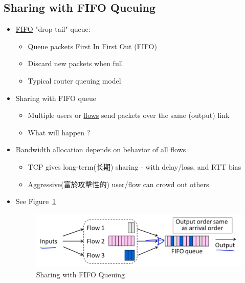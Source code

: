 \documentclass[12pt]{ctexart}   %
\begin{document}
	\subsection{Sharing with FIFO Queuing}
	\begin{itemize}
		\item \underline{FIFO} "drop tail" queue:
		\begin{itemize}
			\item Queue packets First In First Out (FIFO)
			\item Discard new packets when full
			\item Typical router queuing model
		\end{itemize}
		
		\item Sharing with FIFO queue
		\begin{itemize}
			\item Multiple users or \underline{flows} send packets over the same (output) link
			\item What will happen ?
		\end{itemize}
		
		\item Bandwidth allocation depends on behavior of all flows
		\begin{itemize}
			\item TCP gives long-term(长期) sharing - with delay/loss, and RTT bias
			\item Aggressive(富於攻擊性的) user/flow can crowd out others
		\end{itemize}
		\item See Figure~\ref{fig:9-4-2}
		  
		 \begin{figure}[h!] %
		\centering
		 \includegraphics[scale=0.7]{images/9-4-2}
		\caption{ Sharing with FIFO Queuing }
		 \label{fig:9-4-2}
		 \end{figure}
	\end{itemize}
	
\end{document}
